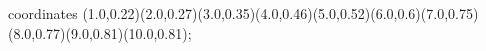					coordinates { (1.0,0.22)(2.0,0.27)(3.0,0.35)(4.0,0.46)(5.0,0.52)(6.0,0.6)(7.0,0.75)(8.0,0.77)(9.0,0.81)(10.0,0.81)};